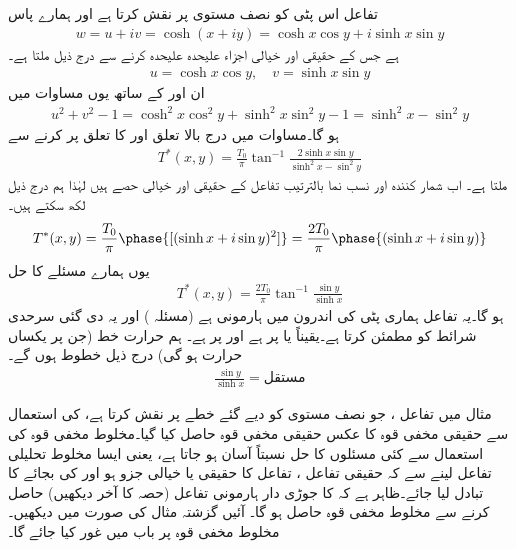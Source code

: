 تفاعل  اس پٹی کو نصف مستوی  پر نقش کرتا ہے اور  ہمارے پاس
\begin{align*}
w=u+iv=\cosh (x+iy)=\cosh x\cos y+i\sinh x\sin y
\end{align*}
ہے جس کے حقیقی اور خیالی اجزاء علیحدہ علیحدہ کرنے سے درج ذیل ملتا ہے۔
\begin{align*}
u=\cosh x\cos y,\quad v=\sinh x\sin y
\end{align*}
ان  اور  کے ساتھ یوں مساوات  میں
\begin{align*}
u^2+v^2-1=\cosh^2 x\cos^2 y+\sinh^2 x\sin^2 y-1=\sinh^2x-\sin^2y
\end{align*}
ہو گا۔مساوات  میں درج بالا تعلق اور  کا تعلق پر کرنے سے
\begin{align*}
T^*(x,y)=\frac{T_0}{\pi}\tan^{-1} \frac{2\sinh x\sin y}{\sinh^2 x-\sin^2 y}
\end{align*}
ملتا ہے۔ اب شمار کنندہ اور نسب نما بالترتیب تفاعل  کے  حقیقی اور خیالی حصے ہیں لہٰذا ہم درج ذیل لکھ سکتے ہیں۔
\begin{align*}
T^*(x,y)=\frac{T_0}{\pi} \phase{[(\sinh x+i\sin y)^2]}=\frac{2T_0}{\pi} \phase{(\sinh x+i\sin y)}
\end{align*}
یوں ہمارے مسئلے کا حل 
\begin{align}
T^*(x,y)=\frac{2T_0}{\pi} \tan^{-1} \frac{\sin y}{\sinh x}
\end{align}
ہو گا۔یہ تفاعل ہماری پٹی کی اندرون میں ہارمونی ہے (مسئلہ ) اور یہ دی گئی سرحدی شرائط کو مطمئن کرتا ہے۔یقیناً  یا  پر  ہے اور  پر  ہے۔ ہم حرارت خط (جن پر یکساں حرارت ہو گی) درج ذیل خطوط ہوں گے۔
\begin{align*}
\frac{\sin y}{\sinh x}=\text{مستقل}
\end{align*}

مثال  میں تفاعل ، جو نصف مستوی کو دیے گئے خطے پر نقش کرتا ہے، کی استعمال سے حقیقی مخفی قوہ   کا عکس حقیقی مخفی قوہ  حاصل کیا گیا۔مخلوط مخفی قوہ کی استعمال سے کئی مسئلوں کا حل نسبتاً آسان ہو جاتا ہے، یعنی ایسا مخلوط تحلیلی تفاعل  لینے سے  کہ حقیقی تفاعل ، تفاعل  کا حقیقی یا خیالی جزو ہو اور  کی بجائے  کا تبادل لیا جائے۔ظاہر ہے کہ  کا جوڑی دار ہارمونی تفاعل (حصہ  کا آخر دیکھیں) حاصل کرنے سے  مخلوط مخفی قوہ   حاصل ہو گا۔  آئیں    گزشتہ مثال کی صورت میں دیکھیں۔مخلوط مخفی قوہ پر  باب  میں غور کیا جائے گا۔

